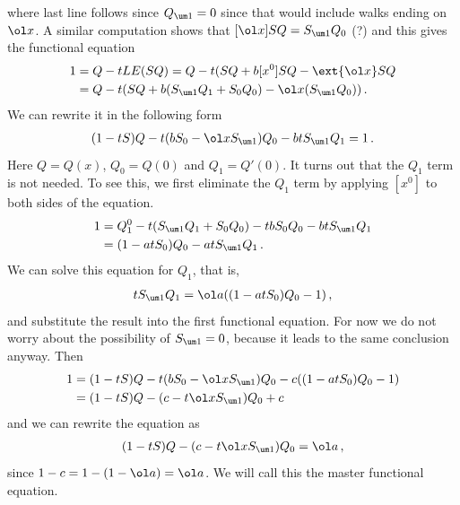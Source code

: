 where last line follows since $Q_{\um 1}= 0$ since that would include walks ending on $\ol x$. A similar computation shows that $[\ol x]SQ = S_{\um 1} Q_0$ (?) and this gives the functional equation
\begin{align}
\begin{split}
	1 &= Q - tLE(SQ) = Q - t(SQ + b[x^0]SQ - \ext{\ol x}SQ\\
	&= Q - t(SQ + b(S_{\um 1}Q_1 + S_0Q_0) - \ol x(S_{\um 1}Q_0))\,.
\end{split}
\end{align}
We can rewrite it in the following form
\begin{align}
	(1-tS)Q - t(bS_0-\ol xS_{\um 1})Q_0 -btS_{\um 1}Q_1 = 1\,.
\end{align}
Here $Q = Q(x)$, $Q_0 = Q(0)$ and $Q_1 = Q'(0)$. It turns out that the $Q_1$ term is not needed. To see this, we first eliminate the $Q_1$ term by applying $[x^0]$ to both sides of the equation.
\begin{align}
\begin{split}
	 1 &= Q_1^0 - t(S_{\um 1}Q_1 +S_0 Q_0) - tbS_0Q_0 - btS_{\um 1}Q_1\\
	 &=(1-atS_0)Q_0-atS_{\um 1}Q_1\,.
\end{split}
\end{align}
We can solve this equation for $Q_1$, that is, 
\begin{align}
	tS_{\um 1}Q_1 = \ol a((1-atS_0)Q_0-1)\,,
\end{align}
and substitute the result into the first functional equation. For now we do not worry about the possibility of $S_{\um 1} = 0$, because it leads to the same conclusion anyway. Then
\begin{align}
\begin{split}
	1 &= (1-tS)Q - t(bS_0-\ol xS_{\um 1})Q_0 - c((1-atS_0)Q_0-1)\\
	& = (1-tS)Q - (c -t\ol xS_{\um 1})Q_0 + c
\end{split}
\end{align}
and we can rewrite the equation as
\begin{align}
	(1-tS)Q - (c -t\ol xS_{\um 1})Q_0 = \ol a\,,
\end{align}
since $1 - c = 1 - (1-\ol a) = \ol a$. We will call this the master functional equation. 

